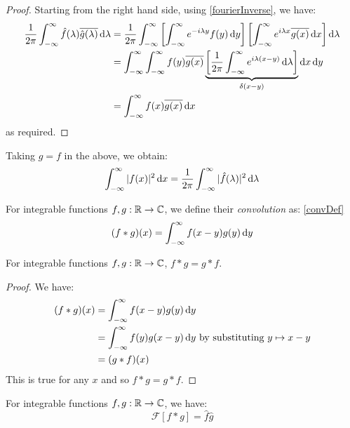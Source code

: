 \documentclass[../main.tex]{subfiles}
\begin{document}
\begin{proof}
Starting from the right hand side, using \cref{fourierInverse}, we have:
\begin{align*}
  \frac{1}{2\pi} \int_{-\infty}^{\infty} \hat{f}(\lambda) \overline{\hat{g}(\lambda)} \d{\lambda} &= \frac{1}{2\pi} \int_{-\infty}^{\infty} \left[\int_{-\infty}^{\infty} e^{-i \lambda y} f(y) \d{y}\right]\left[\int_{-\infty}^{\infty} e^{i\lambda x} \overline{g(x)} \d{x}\right] \d{\lambda} \\
                                                                                                  &= \int_{-\infty}^{\infty} \int_{-\infty}^{\infty}  f(y) \overline{g(x)}\underbrace{\left[\frac{1}{2\pi} \int_{-\infty}^{\infty} e^{i\lambda(x - y)} \d{\lambda}\right]}_{\delta(x - y)} \d{x} \d{y} \\
                                                                                                  &= \int_{-\infty}^{\infty} f(x) \overline{g(x)} \d{x}
\end{align*}
as required.
\end{proof}
\begin{remark}
  Taking $g = f$ in the above, we obtain:
  \[
    \int_{-\infty}^{\infty} |f(x)|^2 \d{x} = \frac{1}{2\pi} \int_{-\infty}^{\infty} |\hat{f}(\lambda)|^2 \d{\lambda}
  \]
\end{remark}
\begin{definition}[Convolution]
  For integrable functions $f, g: \mathbb{R} \to \mathbb{C}$, we define their \textit{convolution} as: \cref{convDef}
  \[
    (f \ast g)(x) = \int_{-\infty}^{\infty} f(x - y)g(y) \d{y}
  \]
\end{definition}
\begin{lemma}
  For integrable functions $f, g: \mathbb{R} \to \mathbb{C}$, $f \ast g = g \ast f$.
\end{lemma}
\begin{proof}
  We have:
  \begin{align*}
    (f \ast g)(x) &= \int_{-\infty}^{\infty} f(x - y)g(y) \d{y} \\
                  &= \int_{-\infty}^{\infty} f(y)g(x - y) \d{y} \text{ by substituting $y \mapsto x - y$} \\
                  &= (g \ast f)(x)
  \end{align*}
  This is true for any $x$ and so $f \ast g = g \ast f$.
\end{proof}
\begin{proposition}
  For integrable functions $f, g: \mathbb{R} \to \mathbb{C}$, we have: \label{convThm}
  \[
    \mathcal{F}[f \ast g] = \hat{f} \hat{g}
  \]
\end{proposition}
\end{document}
